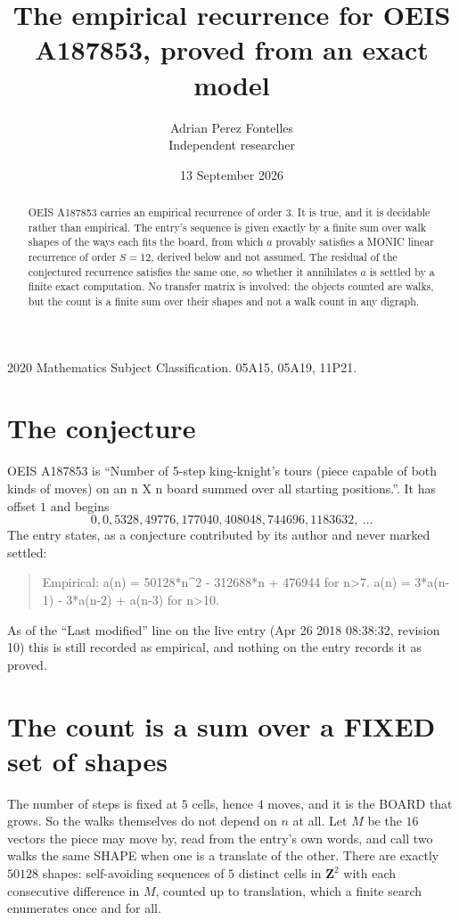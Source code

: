 \documentclass[11pt,a4paper]{article}
\title{The empirical recurrence for OEIS A187853, proved from an exact model}
\author{Adrian Perez Fontelles\\ \small Independent researcher}
\date{13 September 2026}
\theoremstyle{plain}
\theoremstyle{definition}
\begin{document}
\maketitle

\begin{abstract}
OEIS A187853 carries an empirical recurrence of order $3$. It is true, and it is
decidable rather than empirical. The entry's sequence is given exactly by a finite sum over walk shapes of the ways each fits the board, from
which $a$ provably satisfies a MONIC linear recurrence of order $S=12$, derived below and not
assumed. The residual of the conjectured recurrence satisfies the same one, so whether it
annihilates $a$ is settled by a finite exact computation. No transfer matrix is involved: the objects counted are walks, but the count is a finite sum over their shapes and not a walk count in any digraph.
\end{abstract}

\noindent\small 2020 Mathematics Subject Classification. 05A15, 05A19, 11P21.\normalsize

\section{The conjecture}

OEIS A187853 is ``Number of 5-step king-knight's tours (piece capable of both kinds of moves) on an n X n board summed over all starting positions.''. It has offset $1$ and begins
\[
0, 0, 5328, 49776, 177040, 408048, 744696, 1183632,\ \dots
\]
The entry states, as a conjecture contributed by its author and never marked settled:
\begin{quote}
Empirical: a(n) = 50128*n\^{}2 - 312688*n + 476944 for n>7. a(n) = 3*a(n-1) - 3*a(n-2) + a(n-3) for n>10.
\end{quote}
As of the ``Last modified'' line on the live entry (Apr 26 2018 08:38:32, revision 10)
this is still recorded as empirical, and nothing on the entry records it as proved.

\section{The count is a sum over a FIXED set of shapes}

The number of steps is fixed at $5$ cells, hence $4$ moves, and it is the BOARD
that grows. So the walks themselves do not depend on $n$ at all. Let $M$ be the $16$
vectors the piece may move by, read from the entry's own words, and call two walks the same
SHAPE when one is a translate of the other. There are exactly $50128$ shapes: self-avoiding
sequences of $5$ distinct cells in $\mathbf{Z}^{2}$ with each consecutive difference in
$M$, counted up to translation, which a finite search enumerates once and for all.
\end{document}
